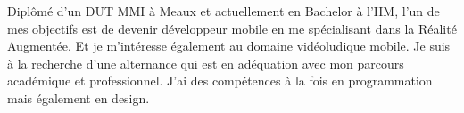 

\begin{cvparagraph}

Diplômé d'un DUT MMI à Meaux et actuellement en Bachelor à l'IIM, l'un de mes objectifs est de devenir développeur mobile en me spécialisant dans la Réalité Augmentée. Et je m'intéresse également au domaine vidéoludique mobile. Je suis à la recherche d'une alternance qui est en adéquation avec mon parcours académique et professionnel. J'ai des compétences à la fois en programmation mais également en design.
\end{cvparagraph}